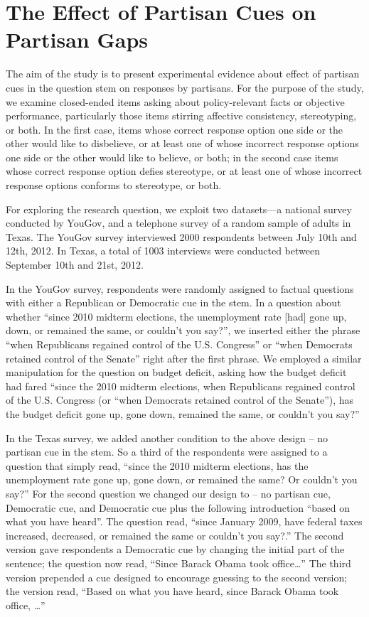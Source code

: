 \documentclass[12pt, letterpaper]{article}
\begin{document}
\section*{The Effect of Partisan Cues on Partisan Gaps}\label{subsec:partisan-cues}
The aim of the study is to present experimental evidence about effect of partisan cues in the question stem on responses by partisans. For the purpose of the study, we examine closed-ended items asking about policy-relevant facts or objective performance, particularly those items stirring affective consistency, stereotyping, or both.  In the first case, items whose correct response option one side or the other would like to disbelieve, or at least one of whose incorrect response options one side or the other would like to believe, or both; in the second case items whose correct response option defies stereotype, or at least one of whose incorrect response options conforms to stereotype, or both.  

For exploring the research question, we exploit two datasets---a national survey conducted by YouGov, and a telephone survey of a random sample of adults in Texas. The YouGov survey interviewed 2000 respondents between July 10th and 12th, 2012.  In Texas, a total of 1003 interviews were conducted between September 10th and 21st, 2012. 

In the YouGov survey, respondents were randomly assigned to factual questions with either a Republican or Democratic cue in the stem. In a question about whether ``since 2010 midterm elections, the unemployment rate [had] gone up, down, or remained the same, or couldn't you say?'', we inserted either the phrase “when Republicans regained control of the U.S. Congress'' or ``when Democrats retained control of the Senate” right after the first phrase. We employed a similar manipulation for the question on budget deficit, asking how the budget deficit had fared “since the 2010 midterm elections, when Republicans regained control of the U.S. Congress (or ``when Democrats retained control of the Senate''), has the budget deficit gone up, gone down, remained the same, or couldn't you say?''

In the Texas survey, we added another condition to the above design – no partisan cue in the stem. So a third of the respondents were assigned to a question that simply read, ``since the 2010 midterm elections, has the unemployment rate gone up, gone down, or remained the same?  Or couldn’t you say?'' For the second question we changed our design to – no partisan cue, Democratic cue, and Democratic cue plus the following introduction “based on what you have heard”. The question read, ``since January 2009, have federal taxes increased, decreased, or remained the same or couldn’t you say?.'' The second version gave respondents a Democratic cue by changing the initial part of the sentence; the question now read, “Since Barack Obama took office\ldots''  The third version prepended a cue designed to encourage guessing to the second version; the version read, “Based on what you have heard, since Barack Obama took office, \ldots''
\end{document}
